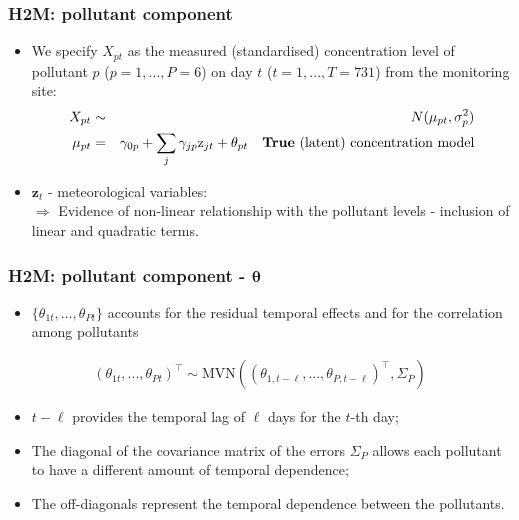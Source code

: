 \documentclass[slidestop,compress,serif,10pt]{beamer}
\begin{document}
\begin{frame}
\frametitle{H2M: pollutant component}
\begin{itemize}
\vfill\item We specify $X_{pt}$ as the measured (standardised) concentration level of pollutant $p$ ($p=1,...,P=6$) on day $t$ ($t=1,...,T=731$) from the monitoring site:
\vspace{10pt}\begin{eqnarray*}
X_{pt}&\sim& N(\mu_{pt}, \sigma^2_p)\\
\mu_{pt}&=& \gamma_{0p} + \sum_j \gamma_{jp}\text{z}_{jt} + \theta_{pt} \hspace{10pt}\text{\textbf{True} (latent) concentration model}
\end{eqnarray*}
\vfill\item $\mathbf{z}_t$ - meteorological variables:\\
$\Rightarrow$ Evidence of non-linear relationship with the pollutant levels - inclusion of linear and quadratic terms.
\end{itemize}
\end{frame}
\begin{frame}
\frametitle{H2M: pollutant component - $\mathbf{\theta}$}
\begin{itemize}
\vfill\item $\{\theta_{1t}, \ldots, \theta_{Pt}\}$ accounts for the residual temporal effects and for the correlation among pollutants
\end{itemize}
\begin{eqnarray*}
(\theta_{1t},...,\theta_{Pt})^\top  \sim \text{MVN}\left((\theta_{1,t-\ell},...,\theta_{P,t-\ell})^\top , \Sigma_P\right)
\end{eqnarray*}
\begin{itemize}
\vfill\item  $t-\ell$ provides the temporal lag of $\ell$ days for the $t$-th day;
\vfill\item The diagonal of the covariance matrix of the errors $\Sigma_P$ allows each pollutant to have a different amount of temporal dependence;
\vfill\item The off-diagonals represent the temporal dependence between the pollutants.
\end{itemize}
\end{frame}
\end{document}
